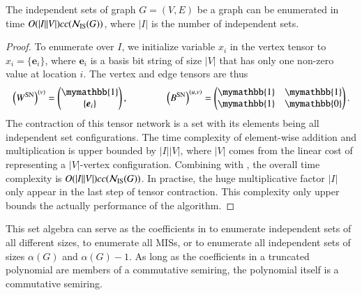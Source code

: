 \documentclass[review, onefignum, onetabnum]{siamart190516}
\begin{document}
\begin{lemma}\label{thm:complexset}
    The independent sets of graph $G = (V, E)$ be a graph can be enumerated in time $O(|I||V|)cc({\mathcal{N}_{\rm IS}(G)})$, where $|I|$ is the number of independent sets.
\end{lemma}
\begin{proof}
To enumerate over $I$,  we initialize variable $x_{i}$ in the vertex tensor to $x_i = \{\boldsymbol{e}_{i}\}$, where $\boldsymbol{e}_i$ is a basis bit string of size $|V|$ that has only one non-zero value at location $i$.
The vertex and edge tensors are thus
\begin{equation}
    \left(W^{\rm SN}\right)^{(v)} = \left(\begin{matrix}
        \mymathbb{1} \\
        \{\boldsymbol{e}_{i}\}
    \end{matrix}\right),   
    \qquad \qquad
        \left(B^{\rm SN}\right)^{(u, v)} = \left(\begin{matrix}
        \mymathbb{1}  & \mymathbb{1} \\
        \mymathbb{1} & \mymathbb{0}
    \end{matrix}\right).
\end{equation}
The contraction of this tensor network is a set with its elements being all independent set configurations. The time complexity of element-wise addition and multiplication is upper bounded by $|I||V|$, where $|V|$ comes from the linear cost of representing a $|V|$-vertex configuration. Combining with , the overall time complexity is $O(|I||V|)cc({\mathcal{N}_{\rm IS}(G)})$.
In practise, the huge multiplicative factor $|I|$ only appear in the last step of tensor contraction.
This complexity only upper bounds the actually performance of the algorithm.
\end{proof}

This set algebra can serve as the coefficients in  to enumerate independent sets of all different sizes,  to enumerate all MISs, or  to enumerate all independent sets of sizes $\alpha(G)$ and $\alpha(G)-1$.
As long as the coefficients in a truncated polynomial are members of a commutative semiring, the polynomial itself is a commutative semiring.
\end{document}
